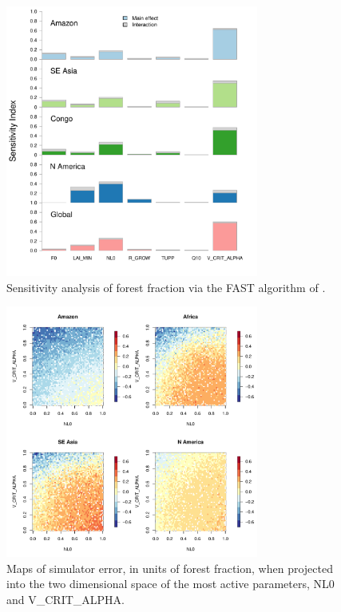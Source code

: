 \documentclass[esd, article]{copernicus} %
\begin{document}
\begin{figure}[t]
\includegraphics[width=8.3cm]{graphics/FAST_histograms.pdf}
\caption{Sensitivity analysis of forest fraction via the FAST algorithm of \cite{saltelli1999sensitivity}.}
\label{fig:FAST_histograms}
\end{figure}

\begin{figure}[t]
\includegraphics[width=8.3cm]{graphics/discrepancy_parameter_space.pdf}
\caption{Maps of simulator error, in units of forest fraction, when projected into the two dimensional space of the most active parameters, NL0 and V\_CRIT\_ALPHA.}
\label{fig:discrepancy_parameter_space}
\end{figure}
\end{document}
